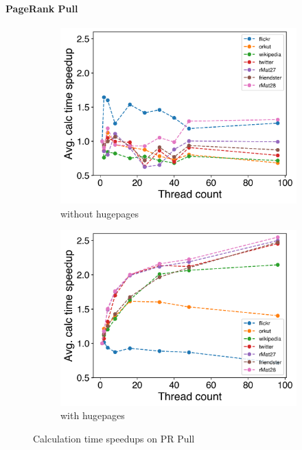 \paragraph{PageRank Pull}
\begin{figure}
	\hfil
	\begin{subfigure}{0.48\columnwidth}
		\includegraphics[width=\linewidth]{../../plots/singleNodePRPullGaloisThreads.png}
		\caption{without hugepages}
		\label{fig:galoisSpeedupPRPull_noHP}
	\end{subfigure}
	\begin{subfigure}{0.48\columnwidth}
		\includegraphics[width=\linewidth]{../../plots/singleNodePRPullGaloisHPThreads.png}
		\caption{with hugepages}
		\label{fig:galoisSpeedupPRPull_HP}
	\end{subfigure}
	\hfil
	\caption{Calculation time speedups on PR Pull}
	\label{fig:galoisSpeedupPRPull}
\end{figure}

